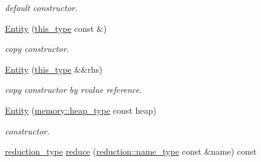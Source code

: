 \begin{DoxyCompactItemize}
\begin{DoxyCompactList}\small\item\em default constructor. \end{DoxyCompactList}\item 
\hypertarget{classhryky_1_1http_1_1header_1_1server_1_1_entity_a22fead1ebea16a76d69cffc943e31acb}{\hyperlink{classhryky_1_1http_1_1header_1_1server_1_1_entity_a22fead1ebea16a76d69cffc943e31acb}{Entity} (\hyperlink{classhryky_1_1http_1_1header_1_1server_1_1_entity_a0009d4111326ee03ac700834367f90fa}{this\-\_\-type} const \&)}\label{classhryky_1_1http_1_1header_1_1server_1_1_entity_a22fead1ebea16a76d69cffc943e31acb}

\begin{DoxyCompactList}\small\item\em copy constructor. \end{DoxyCompactList}\item 
\hypertarget{classhryky_1_1http_1_1header_1_1server_1_1_entity_aab801ea1ad6ec89d69faa618d0a7b7f0}{\hyperlink{classhryky_1_1http_1_1header_1_1server_1_1_entity_aab801ea1ad6ec89d69faa618d0a7b7f0}{Entity} (\hyperlink{classhryky_1_1http_1_1header_1_1server_1_1_entity_a0009d4111326ee03ac700834367f90fa}{this\-\_\-type} \&\&rhs)}\label{classhryky_1_1http_1_1header_1_1server_1_1_entity_aab801ea1ad6ec89d69faa618d0a7b7f0}

\begin{DoxyCompactList}\small\item\em copy constructor by rvalue reference. \end{DoxyCompactList}\item 
\hypertarget{classhryky_1_1http_1_1header_1_1server_1_1_entity_a28091a6b7bf2916e231f6ff16b372034}{\hyperlink{classhryky_1_1http_1_1header_1_1server_1_1_entity_a28091a6b7bf2916e231f6ff16b372034}{Entity} (\hyperlink{classhryky_1_1memory_1_1heap_1_1_base}{memory\-::heap\-\_\-type} const heap)}\label{classhryky_1_1http_1_1header_1_1server_1_1_entity_a28091a6b7bf2916e231f6ff16b372034}

\begin{DoxyCompactList}\small\item\em constructor. \end{DoxyCompactList}\item 
\hypertarget{classhryky_1_1http_1_1header_1_1server_1_1_entity_a5a836f59a3a170e1ed6ecca11bc290e7}{\hyperlink{namespacehryky_a343a9a4c36a586be5c2693156200eadc}{reduction\-\_\-type} \hyperlink{classhryky_1_1http_1_1header_1_1server_1_1_entity_a5a836f59a3a170e1ed6ecca11bc290e7}{reduce} (\hyperlink{namespacehryky_1_1reduction_ac686c30a4c8d196bbd0f05629a6b921f}{reduction\-::name\-\_\-type} const \&name) const }\label{classhryky_1_1http_1_1header_1_1server_1_1_entity_a5a836f59a3a170e1ed6ecca11bc290e7}


\end{DoxyCompactItemize}
